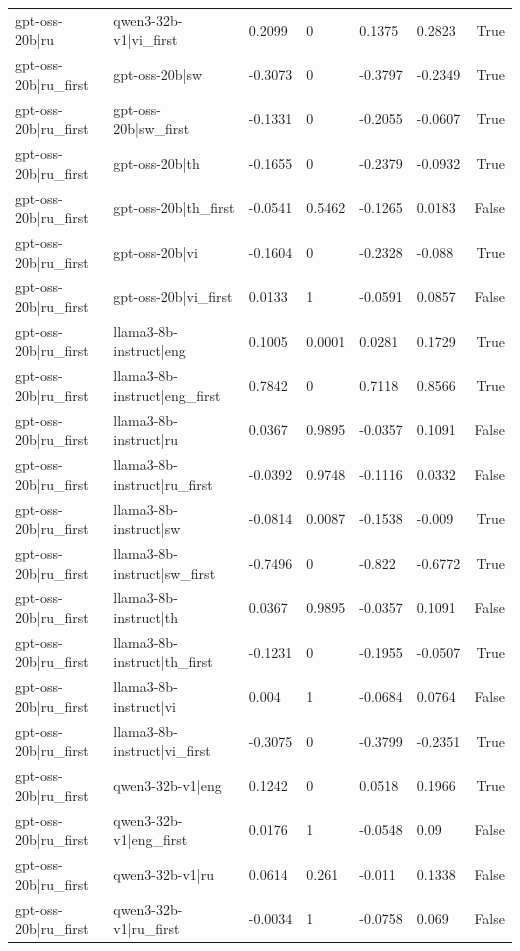 \begin{table}
\begin{tabular}{llllllr}
gpt-oss-20b|ru & qwen3-32b-v1|vi_first & 0.2099 & 0 & 0.1375 & 0.2823 & True \\
gpt-oss-20b|ru_first & gpt-oss-20b|sw & -0.3073 & 0 & -0.3797 & -0.2349 & True \\
gpt-oss-20b|ru_first & gpt-oss-20b|sw_first & -0.1331 & 0 & -0.2055 & -0.0607 & True \\
gpt-oss-20b|ru_first & gpt-oss-20b|th & -0.1655 & 0 & -0.2379 & -0.0932 & True \\
gpt-oss-20b|ru_first & gpt-oss-20b|th_first & -0.0541 & 0.5462 & -0.1265 & 0.0183 & False \\
gpt-oss-20b|ru_first & gpt-oss-20b|vi & -0.1604 & 0 & -0.2328 & -0.088 & True \\
gpt-oss-20b|ru_first & gpt-oss-20b|vi_first & 0.0133 & 1 & -0.0591 & 0.0857 & False \\
gpt-oss-20b|ru_first & llama3-8b-instruct|eng & 0.1005 & 0.0001 & 0.0281 & 0.1729 & True \\
gpt-oss-20b|ru_first & llama3-8b-instruct|eng_first & 0.7842 & 0 & 0.7118 & 0.8566 & True \\
gpt-oss-20b|ru_first & llama3-8b-instruct|ru & 0.0367 & 0.9895 & -0.0357 & 0.1091 & False \\
gpt-oss-20b|ru_first & llama3-8b-instruct|ru_first & -0.0392 & 0.9748 & -0.1116 & 0.0332 & False \\
gpt-oss-20b|ru_first & llama3-8b-instruct|sw & -0.0814 & 0.0087 & -0.1538 & -0.009 & True \\
gpt-oss-20b|ru_first & llama3-8b-instruct|sw_first & -0.7496 & 0 & -0.822 & -0.6772 & True \\
gpt-oss-20b|ru_first & llama3-8b-instruct|th & 0.0367 & 0.9895 & -0.0357 & 0.1091 & False \\
gpt-oss-20b|ru_first & llama3-8b-instruct|th_first & -0.1231 & 0 & -0.1955 & -0.0507 & True \\
gpt-oss-20b|ru_first & llama3-8b-instruct|vi & 0.004 & 1 & -0.0684 & 0.0764 & False \\
gpt-oss-20b|ru_first & llama3-8b-instruct|vi_first & -0.3075 & 0 & -0.3799 & -0.2351 & True \\
gpt-oss-20b|ru_first & qwen3-32b-v1|eng & 0.1242 & 0 & 0.0518 & 0.1966 & True \\
gpt-oss-20b|ru_first & qwen3-32b-v1|eng_first & 0.0176 & 1 & -0.0548 & 0.09 & False \\
gpt-oss-20b|ru_first & qwen3-32b-v1|ru & 0.0614 & 0.261 & -0.011 & 0.1338 & False \\
gpt-oss-20b|ru_first & qwen3-32b-v1|ru_first & -0.0034 & 1 & -0.0758 & 0.069 & False \\

\end{tabular}
\end{table}
